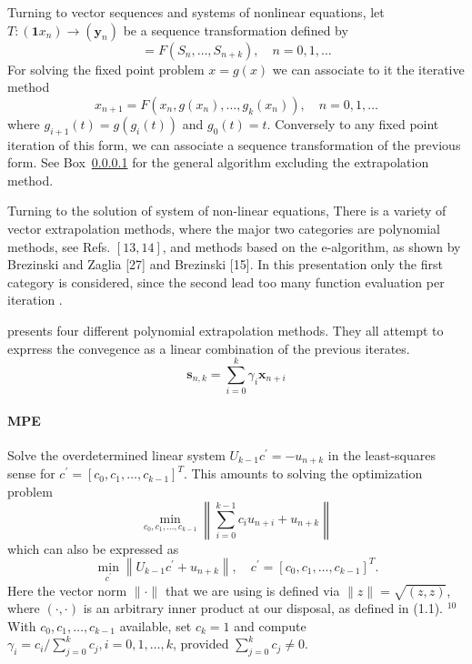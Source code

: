 Turning to vector sequences and systems of nonlinear equations, let \(T:\left(\mathbf 1x_{n}\right) \to\left(\mathbf y_{n}\right)\) be a sequence transformation defined by
\begin{equation}
=F\left(S_{n}, \ldots, S_{n+k}\right), \quad n=0,1, \ldots
\end{equation}
For solving the fixed point problem \(x=g(x)\) we can associate to it the iterative method
\begin{equation}
x_{n+1}=F\left(x_{n}, g\left(x_{n}\right), \ldots, g_{k}\left(x_{n}\right)\right), \quad n=0,1, \ldots
\end{equation}
where \(g_{i+1}(t)=g\left(g_{i}(t)\right)\) and \(g_{0}(t)=t\).
Conversely to any fixed point iteration of this form, we can associate a sequence transformation of the previous form.
See Box~\ref{} for the general algorithm excluding the extrapolation method.

Turning to the solution of system of non-linear equations, 
There is a variety of vector extrapolation methods, where the major two categories are polynomial methods, see Refs. \([13,14]\), and methods based on the e-algorithm, as shown by Brezinski and Zaglia [27] and Brezinski [15].
In this presentation only the first category is considered, since the second lead too many function evaluation per iteration \cite{sidi}.

\cite{} presents four different polynomial extrapolation methods.
They all attempt to exprress the convegence as a linear combination of the previous iterates.
\[
\mathbf{s}_{n, k}=\sum_{i=0}^{k} \gamma_{i} \mathbf x_{n+i}
\]

\paragraph{MPE}

Solve the overdetermined linear system \(U_{k-1} c^{\prime}=-u_{n+k}\) in the least-squares sense for \(c^{\prime}=\left[c_{0}, c_{1}, \ldots, c_{k-1}\right]^{T}\). This amounts to solving the optimization problem
\[
\min _{c_{0}, c_{1}, \ldots, c_{k-1}}\left\|\sum_{i=0}^{k-1} c_{i} u_{n+i}+u_{n+k}\right\|
\]
which can also be expressed as
\[
\min _{c^{\prime}}\left\|U_{k-1} c^{\prime}+u_{n+k}\right\|, \quad c^{\prime}=\left[c_{0}, c_{1}, \ldots, c_{k-1}\right]^{T} .
\]
Here the vector norm \(\|\cdot\|\) that we are using is defined via \(\|z\|=\sqrt{(z, z)}\), where \((\cdot, \cdot)\) is an arbitrary inner product at our disposal, as defined in (1.1). \({ }^{10}\) With \(c_{0}, c_{1}, \ldots, c_{k-1}\) available, set \(c_{k}=1\) and compute \(\gamma_{i}=c_{i} / \sum_{j=0}^{k} c_{j}, i=0,1, \ldots, k\), provided \(\sum_{j=0}^{k} c_{j} \neq 0\).

